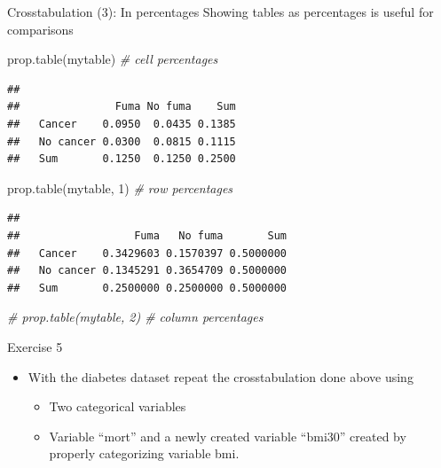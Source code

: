 \documentclass[
  ignorenonframetext,
]{beamer}
\newenvironment{Shaded}{\begin{snugshade}}{\end{snugshade}}
\newcommand{\CommentTok}[1]{\textcolor[rgb]{0.56,0.35,0.01}{\textit{#1}}}
\newcommand{\DecValTok}[1]{\textcolor[rgb]{0.00,0.00,0.81}{#1}}
\newcommand{\FunctionTok}[1]{\textcolor[rgb]{0.00,0.00,0.00}{#1}}
\newcommand{\NormalTok}[1]{#1}
\providecommand{\tightlist}{%
  \setlength{\itemsep}{0pt}\setlength{\parskip}{0pt}}
\begin{document}
\begin{frame}[fragile]{Crosstabulation (3): In percentages}
\protect\hypertarget{crosstabulation-3-in-percentages}{}
Showing tables as percentages is useful for comparisons

\begin{Shaded}
\begin{Highlighting}[]
\FunctionTok{prop.table}\NormalTok{(mytable) }\CommentTok{\# cell percentages}
\end{Highlighting}
\end{Shaded}

\begin{verbatim}
##            
##               Fuma No fuma    Sum
##   Cancer    0.0950  0.0435 0.1385
##   No cancer 0.0300  0.0815 0.1115
##   Sum       0.1250  0.1250 0.2500
\end{verbatim}

\begin{Shaded}
\begin{Highlighting}[]
\FunctionTok{prop.table}\NormalTok{(mytable, }\DecValTok{1}\NormalTok{) }\CommentTok{\# row percentages}
\end{Highlighting}
\end{Shaded}

\begin{verbatim}
##            
##                  Fuma   No fuma       Sum
##   Cancer    0.3429603 0.1570397 0.5000000
##   No cancer 0.1345291 0.3654709 0.5000000
##   Sum       0.2500000 0.2500000 0.5000000
\end{verbatim}

\begin{Shaded}
\begin{Highlighting}[]
\CommentTok{\# prop.table(mytable, 2) \# column percentages}
\end{Highlighting}
\end{Shaded}
\end{frame}

\begin{frame}{Exercise 5}
\protect\hypertarget{exercise-5}{}
\begin{itemize}
\tightlist
\item
  With the diabetes dataset repeat the crosstabulation done above using

  \begin{itemize}
  \tightlist
  \item
    Two categorical variables
  \item
    Variable ``mort'' and a newly created variable ``bmi30'' created by
    properly categorizing variable bmi.
  \end{itemize}
\end{itemize}
\end{frame}
\end{document}
